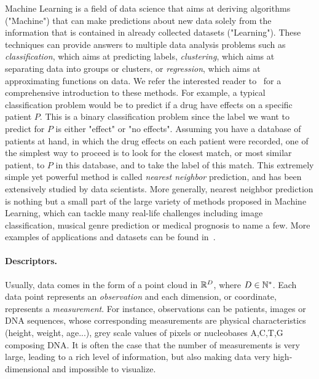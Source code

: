 Machine Learning is a field of data science that aims at deriving algorithms ("Machine") that can make
predictions about new data solely from the information that is contained in already collected datasets ("Learning").
These techniques can provide answers to multiple data analysis problems such as {\em classification}, which aims at predicting labels,
{\em clustering}, which aims at separating data into groups or clusters, or {\em regression}, which aims at approximating functions on data.
We refer the interested reader to~\cite{Friedman01} for a comprehensive introduction to these methods.
For example, a typical classification problem would be to predict if a drug have effects on a specific patient $P$. This is a binary classification
problem since the label we want to predict for $P$ is either "effect" or "no effects".
Assuming you have a database of patients at hand, in which the drug effects on each patient were recorded, one of the simplest way to proceed is
to look for the closest match, or most similar patient, to $P$ in this database, 
and to take the label of this match.  
This extremely simple yet powerful method
is called {\em nearest neighbor} prediction, and has been extensively studied by data scientists. 
More generally, nearest neighbor prediction is nothing but a small part of the large variety of methods proposed in Machine Learning, 
which can tackle many real-life challenges including image classification, musical genre prediction or medical prognosis to name a few.
More examples of applications and datasets can be found in~\cite{Friedman01}. %
    


\paragraph*{Descriptors.} Usually, data comes in the form of a point cloud in $\mathbb{R}^D$, where $D\in\mathbb{N}^*$. 
Each data point represents an {\em observation} and each dimension, 
or coordinate, represents a {\em measurement}. For instance, observations can be patients, images or DNA sequences, whose corresponding measurements are
physical characteristics (height, weight, age...), grey scale values of pixels or nucleobases A,C,T,G composing DNA.
It is often the case that the number of measurements is very large, leading to a rich level of information, but also making 
data very high-dimensional and impossible to visualize.  

